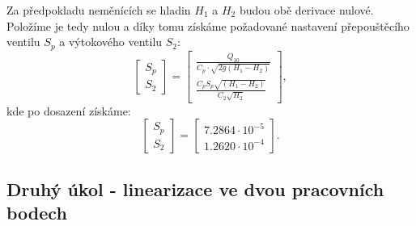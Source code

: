 \documentclass[a4paper,11pt]{article}
\begin{document}
Za předpokladu neměnících se hladin $H_{1}$ a $ H_{2} $ budou obě derivace nulové. Položíme je tedy nulou a díky tomu získáme požadované nastavení přepouštěcího ventilu $S_{p}$ a výtokového ventilu $S_{2}$:
\begin{equation}\label{eq:vypocet_ventilu}
\left [\begin{array}{cc}
S_{p} \\
S_{2}
\end{array}\right ] = 
\left [\begin{array}{cc}
\frac{Q_{10}}{C_{p}\cdot \sqrt{2g\left ( H_{1}-H_{2} \right )}}\\
\frac{C_{p} S_{p}\sqrt{\left ( H_{1}-H_{2} \right )}}{C_{2} \sqrt{H_{2}}}\end{array}\right ],
\end{equation}
kde po dosazení získáme:
\begin{equation}\label{eq:nastaveni_ventilu_10}
\left [\begin{array}{cc}
S_{p} \\
S_{2}
\end{array}\right ] = 
\left [\begin{array}{cc}
7.2864\cdot 10^{-5}\\
1.2620\cdot 10^{-4}\end{array}\right ].
\end{equation}

\newpage 
\subsection{Druhý úkol - linearizace ve dvou pracovních bodech}\label{sec:2}
\end{document}
